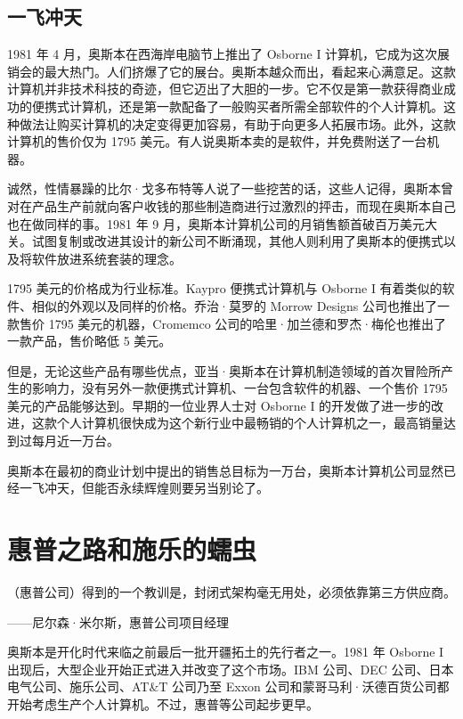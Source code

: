 \documentclass[12pt,UTF8]{ctexbook}
\begin{document}
\subsection{一飞冲天}


1981 年 4 月，奥斯本在西海岸电脑节上推出了 Osborne I 计算机，它成为这次展销会的最大热门。人们挤爆了它的展台。奥斯本越众而出，看起来心满意足。这款计算机并非技术科技的奇迹，但它迈出了大胆的一步。它不仅是第一款获得商业成功的便携式计算机，还是第一款配备了一般购买者所需全部软件的个人计算机。这种做法让购买计算机的决定变得更加容易，有助于向更多人拓展市场。此外，这款计算机的售价仅为 1795 美元。有人说奥斯本卖的是软件，并免费附送了一台机器。

诚然，性情暴躁的比尔·戈多布特等人说了一些挖苦的话，这些人记得，奥斯本曾对在产品生产前就向客户收钱的那些制造商进行过激烈的抨击，而现在奥斯本自己也在做同样的事。1981 年 9 月，奥斯本计算机公司的月销售额首破百万美元大关。试图复制或改进其设计的新公司不断涌现，其他人则利用了奥斯本的便携式以及将软件放进系统套装的理念。

1795 美元的价格成为行业标准。Kaypro 便携式计算机与 Osborne I 有着类似的软件、相似的外观以及同样的价格。乔治·莫罗的 Morrow Designs 公司也推出了一款售价 1795 美元的机器，Cromemco 公司的哈里·加兰德和罗杰·梅伦也推出了一款产品，售价略低 5 美元。

但是，无论这些产品有哪些优点，亚当·奥斯本在计算机制造领域的首次冒险所产生的影响力，没有另外一款便携式计算机、一台包含软件的机器、一个售价 1795 美元的产品能够达到。早期的一位业界人士对 Osborne I 的开发做了进一步的改进，这款个人计算机很快成为这个新行业中最畅销的个人计算机之一，最高销量达到过每月近一万台。

奥斯本在最初的商业计划中提出的销售总目标为一万台，奥斯本计算机公司显然已经一飞冲天，但能否永续辉煌则要另当别论了。





\section{惠普之路和施乐的蠕虫}


（惠普公司）得到的一个教训是，封闭式架构毫无用处，必须依靠第三方供应商。

——尼尔森·米尔斯，惠普公司项目经理



奥斯本是开化时代来临之前最后一批开疆拓土的先行者之一。1981 年 Osborne I 出现后，大型企业开始正式进入并改变了这个市场。IBM 公司、DEC 公司、日本电气公司、施乐公司、AT\&T 公司乃至 Exxon 公司和蒙哥马利·沃德百货公司都开始考虑生产个人计算机。不过，惠普等公司起步更早。
\end{document}
